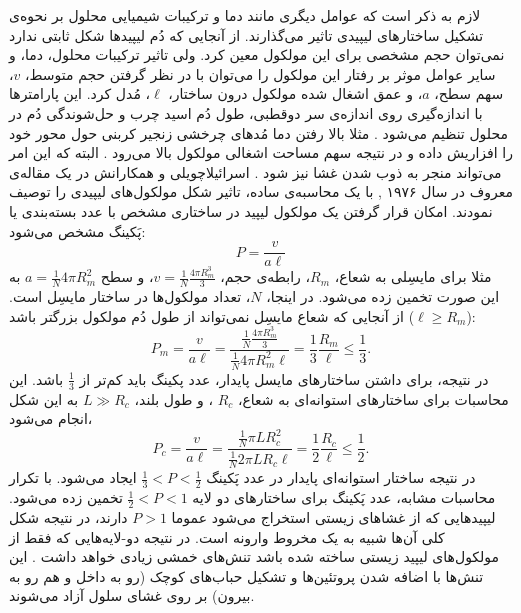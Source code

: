 لازم به ذکر است که عوامل دیگری مانند دما و ترکیبات شیمیایی محلول بر نحوه‌ی تشکیل ساختار‌های لیپیدی تاثیر می‌گذارند. از آنجایی که دُم لیپید‌ها شکل ثابتی ندارد نمی‌توان حجم مشخصی برای این مولکول معین کرد. ولی تاثیر ترکیبات محلول، دما، و سایر عوامل موثر بر رفتار این مولکول را می‌توان با در نظر گرفتن حجم متوسط،
$v$، سهم سطح، 
$a$، و عمق اشغال شده مولکول درون ساختار،
$\ell$، مُدل کرد. این پارامتر‌ها با اندازه‌گیری روی اندازه‌ی سر دوقطبی، طول د‌ُم اسید چرب و حل‌شوندگی دُم در محلول تنظیم می‌شود
\cite{LifeAsaMatterofFat2005}. مثلا بالا رفتن دما  مُد‌های چرخشی زنجیر کربنی حول محور خود را افزاریش داده و در نتیجه سهم مساحت اشغالی مولکول بالا می‌رود
\cite{BiomembranesBook1989}. البته که این امر می‌تواند منجر به ذوب شدن غشا نیز شود
\cite{BioMemBook2007}.
 اسرائیلاچویلی
و همکارانش در یک مقاله‌ی معروف در سال ۱۹۷۶
\cite{Israelachvili1976},
 با یک محاسبه‌ی ساده، تاثیر شکل مولکول‌های لیپیدی را توصیف نمودند. امکان قرار گرفتن یک مولکول لیپید در ساختاری مشخص با عدد بسته‌بندی یا پَکینگ
مشخص می‌شود:
\begin{equation}
P=\frac{v}{a\ell}
\end{equation}
مثلا برای مایسِلی به شعاع، 
$R_m$، رابطه‌ی حجم، 
$v=\frac{1}{N}\frac{4\pi R_m^3}{3}$، و سطح 
$a=\frac{1}{N}4\pi R_m^2$ 
به این صورت تخمین زده می‌شود. در اینجا،
$N$، تعداد مولکول‌ها در ساختار مایسِل است. از آنجایی که شعاع مایسِل نمی‌تواند از طول دُم مولکول بزرگتر باشد 
($\ell\geq R_m$):
\begin{equation}
P_m=\frac{v}{a\ell}=\frac{\frac{1}{N}\frac{4\pi R_m^3}{3}}{\frac{1}{N}4\pi R_m^2\ell}=\frac{1}{3}\frac{R_m}{\ell}\leq\frac{1}{3}.
\end{equation}
در نتیجه، برای داشتن ساختار‌های مایسل پایدار، عدد پکینگ باید کم‌تر از 
$\frac{1}{3}$
باشد. این محاسبات برای  ساختارهای استوانه‌ای به شعاع، 
$R_c$
، و طول بلند، 
$L\gg R_c$
به این شکل انجام می‌شود،
\begin{equation}
P_c=\frac{v}{a\ell}=\frac{\frac{1}{N}\pi LR_c^2}{\frac{1}{N}2\pi LR_c\ell}=\frac{1}{2}\frac{R_c}{\ell}\leq\frac{1}{2}.
\end{equation}
در نتیجه ساختار استوانه‌ای پایدار در عدد پَکینگ 
$\frac{1}{3}<P<\frac{1}{2}$
ایجاد می‌شود. با تکرار محاسبات مشابه، عدد پَکینگ برای ساختار‌های دو لایه
$\frac{1}{2}<P<1$
تخمین زده می‌شود. لیپید‌هایی که از غشاهای زیستی استخراج می‌شود عموما
$P>1$
دارند، در نتیجه‌ شکل کلی آن‌ها شبیه به یک مخروط وارونه است. در نتیجه دو-لایه‌هایی که فقط از مولکول‌های لیپید زیستی ساخته شده باشد تنش‌های خمشی زیادی خواهد داشت
\cite{Mouritsen2011,Membraneasamatteroffat}. این تنش‌ها با اضافه شدن پروتئین‌ها و تشکیل حباب‌های کوچک (رو به داخل
و هم رو به بیرون) 
 بر روی غشای سلول آزاد می‌شوند.



